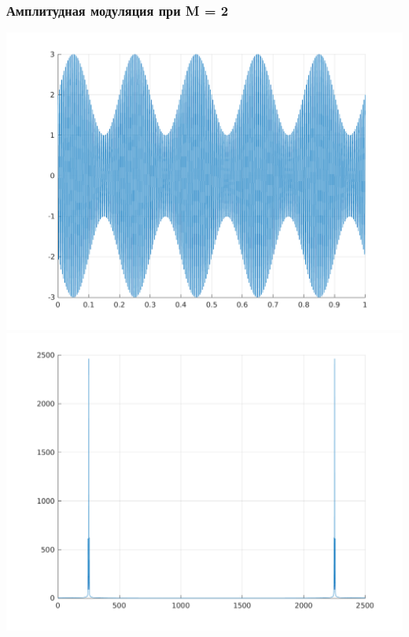\documentclass[a4paper]{article}
\begin{document}
\subsubsection{Амплитудная модуляция при M = 2}
\includegraphics[scale=0.45]{lab4/figures/figure_3.png}
\includegraphics[scale=0.45]{lab4/figures/figure_4.png}\\
\end{document}
